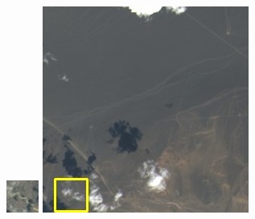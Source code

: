 \documentclass[10pt,UTF8,fntef]{ctexart}
\begin{document}
\begin{multicols}{2}
\begin{figure}[H]
{\begin{minipage}[b]{0.15\linewidth}
            \includegraphics[width=1\linewidth]{../log/spoon4/cut/tmp_cut_LC80980712014024LGN00_15440_color.jpg}\vspace{4pt}
            \includegraphics[width=1\linewidth]{../log/spoon4/cut/LC81390292014135LGN00_14081_color.jpg}\vspace{4pt}

\end{minipage}}
\end{figure}
\end{multicols}
\end{document}
